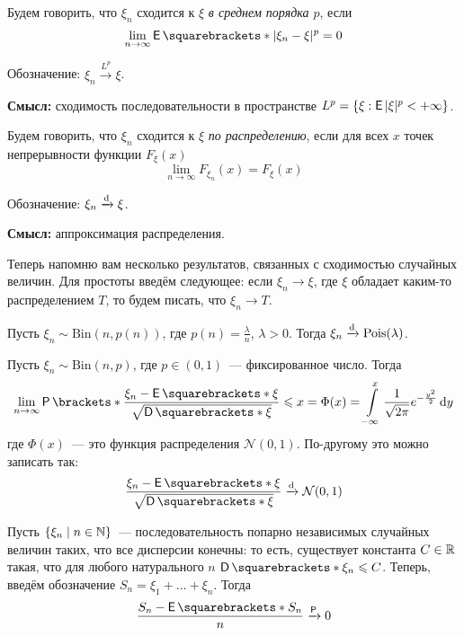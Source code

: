 \begin{definition}
	Будем говорить, что \(\xi_n\) сходится к \(\xi\) \emph{в среднем порядка \(p\)}, если
	\[
	\lim\limits_{n \to \infty} \E{|\xi_n - \xi|^p} = 0
	\]
	
	Обозначение: \(\xi_n \xrightarrow{L^p} \xi\).
\end{definition}

\textbf{Смысл:} сходимость последовательности в пространстве \(L^{p} = \{\xi : \E|\xi|^p < +\infty\}\).

\begin{definition}
	Будем говорить, что \(\xi_n\) сходится к \(\xi\) \emph{по распределению}, если для всех \(x\) точек непрерывности функции $F_{\xi}(x)$
	\[
	\lim\limits_{n \to \infty} F_{\xi_n}(x) = F_{\xi}(x)
	\]
	
	Обозначение: \(\xi_n \xrightarrow{\mathrm{d}} \xi\).
\end{definition}

\textbf{Смысл:} аппроксимация распределения.

Теперь напомню вам несколько результатов, связанных с сходимостью случайных величин. Для простоты введём следующее: если \(\xi_n \to \xi\), где \(\xi\) обладает каким-то распределением \(T\), то будем писать, что \(\xi_n \to T\).

\begin{theorem}[Пуассон]
	Пусть \(\xi_n \sim \mathrm{Bin}(n, p(n))\), где \(p(n) = \frac{\lambda}{n}\), \(\lambda > 0\). Тогда \(\xi_n \xrightarrow{\mathrm{d}} \mathrm{Pois}(\lambda)\). 
\end{theorem}
\begin{theorem}
	Пусть \(\xi_n \sim \mathrm{Bin}(n, p)\), где \(p \in (0, 1)\)~--- фиксированное число. Тогда
	\[
		\lim\limits_{n \to \infty} \Pr{\frac{\xi_n - \E{\xi}}{\sqrt{\D{\xi}}} \leq x} = \Phi(x) = \int\limits_{-\infty}^{x} \frac{1}{\sqrt{2\pi}}e^{-\frac{y^2}{2}}\diff y
	\]
	где \(\Phi(x)\)~--- это функция распределения \(\mathcal{N}(0, 1)\). По-другому это можно записать так:
	\[
		\frac{\xi_n - \E{\xi}}{\sqrt{\D{\xi}}} \dto \mathcal{N}(0, 1)
	\]
\end{theorem}
\begin{theorem}
	Пусть \(\{\xi_n \mid n \in \mathbb{N}\}\)~--- последовательность попарно независимых случайных величин таких, что все дисперсии конечны: то есть, существует константа \(C \in \mathbb{R}\) такая, что для любого натурального \(n\) \(\D{\xi_n} \leq C\). Теперь, введём обозначение \(S_n = \xi_1 + \dots + \xi_n\). Тогда
	\[
		\frac{S_n - \E{S_n}}{n} \prto 0
	\]
\end{theorem}

